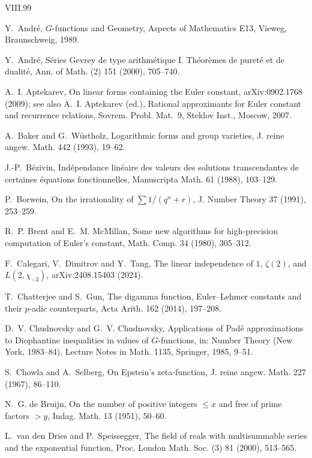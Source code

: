 \documentclass[11pt,a4paper]{article}
\theoremstyle{definition}
\theoremstyle{remark}
\numberwithin{equation}{section}
\begin{document}
\begin{thebibliography}{VIII.99}

 Y.~Andr\'e, $G$-functions and Geometry, Aspects of Mathematics E13, Vieweg, Braunschweig, 1989.

 Y.~Andr\'e, S\'eries Gevrey de type arithm\'etique I. Th\'eor\`emes de puret\'e et de dualit\'e, Ann. of Math. (2) 151 (2000), 705--740.

 A.~I. Aptekarev, On linear forms containing the Euler constant, arXiv:0902.1768 (2009); see also A.~I. Aptekarev (ed.), Rational approximants for Euler constant and recurrence relations, Sovrem. Probl. Mat.~9, Steklov Inst., Moscow, 2007.

 A.~Baker and G.~W\"ustholz, Logarithmic forms and group varieties, J. reine angew. Math. 442 (1993), 19--62.

 J.-P.~B\'ezivin, Ind\'ependance lin\'eaire des valeurs des solutions transcendantes de certaines \'equations fonctionnelles, Manuscripta Math. 61 (1988), 103--129.

 P.~Borwein, On the irrationality of $\sum 1/(q^n+r)$, J. Number Theory 37 (1991), 253--259.

 R.~P. Brent and E.~M. McMillan, Some new algorithms for high-precision computation of Euler's constant, Math. Comp. 34 (1980), 305--312.

 F.~Calegari, V.~Dimitrov and Y.~Tang, The linear independence of $1$, $\zeta(2)$, and $L(2,\chi_{-3})$, arXiv:2408.15403 (2024).

 T.~Chatterjee and S.~Gun, The digamma function, Euler--Lehmer constants and their $p$-adic counterparts, Acta Arith. 162 (2014), 197--208.

 D.~V. Chudnovsky and G.~V. Chudnovsky, Applications of Pad\'e approximations to Diophantine inequalities in values of $G$-functions, in: Number Theory (New York, 1983--84), Lecture Notes in Math. 1135, Springer, 1985, 9--51.

 S.~Chowla and A.~Selberg, On Epstein's zeta-function, J. reine angew. Math. 227 (1967), 86--110.

 N.~G. de Bruijn, On the number of positive integers $\le x$ and free of prime factors $>y$, Indag. Math. 13 (1951), 50--60.

 L.~van den Dries and P.~Speissegger, The field of reals with multisummable series and the exponential function, Proc. London Math. Soc. (3) 81 (2000), 513--565.


\end{thebibliography}
\end{document}

